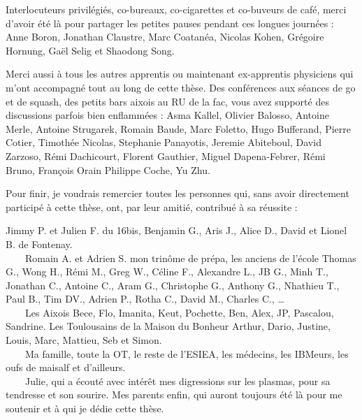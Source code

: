 Interlocuteurs privilégiés, co-bureaux, co-cigarettes et co-buveurs de café,
merci d'avoir été là pour partager les petites pauses pendant ces longues
journées :
Anne Boron, Jonathan Claustre, Marc Coatanéa, Nicolas Kohen, Grégoire Hornung, Gaël Selig et Shaodong Song.

Merci aussi à tous les autres apprentis ou maintenant ex-apprentis physiciens
qui m'ont accompagné tout au long de cette thèse. Des conférences aux séances de
go et de squash, des petits bars aixois au RU de la fac, vous avez supporté des
discussions parfois bien enflammées : Asma Kallel, Olivier Balosso, Antoine
Merle, Antoine Strugarek,
Romain Baude,
Marc Foletto,
Hugo Bufferand,
Pierre Cotier,
Timothée Nicolas,
Stephanie Panayotis,
Jeremie Abiteboul,
David Zarzoso,
Rémi Dachicourt,
Florent Gauthier,
Miguel Dapena-Febrer,
Rémi Bruno,
François Orain
Philippe Coche,
Yu Zhu.

Pour finir, je voudrais remercier toutes les personnes qui, sans avoir
directement participé à cette thèse, ont, par leur amitié, contribué à sa
réussite : 


Jimmy P. et Julien F. du 16bis, Benjamin
G., Aris J., Alice D., David et Lionel B. de Fontenay.
\\
\mbox{~~~~}Romain A. et Adrien S.
mon trinôme de prépa, les anciens de l'école Thomas G., Wong H., Rémi M., Greg
W., Céline F., Alexandre L., JB G., Minh T., Jonathan C., Antoine C., Aram G., Christophe G., Anthony G., Nhathieu T., Paul B., Tim DV., Adrien P., Rotha C.,
David M., Charles C., \ldots
\\
\mbox{~~~~}Les Aixois Bece, Flo, Imanita, Keut, Pochette,
Ben, Alex, JP, Pascalou, Sandrine. Les Toulousains de la
Maison du Bonheur Arthur, Dario, Justine, Louis, Marc, Mattieu, Seb et
Simon.
\\
\mbox{~~~~}Ma famille, toute la OT, le reste de l'ESIEA, les médecins, les
IBMeurs, les oufs de maisalf et d'ailleurs.
\\
\mbox{~~~~}Julie, qui a écouté avec intérêt mes digressions sur les plasmas,
pour sa tendresse et son sourire.
Mes parents enfin, qui auront toujours été là pour me soutenir et à qui je dédie
cette thèse.
\fi



